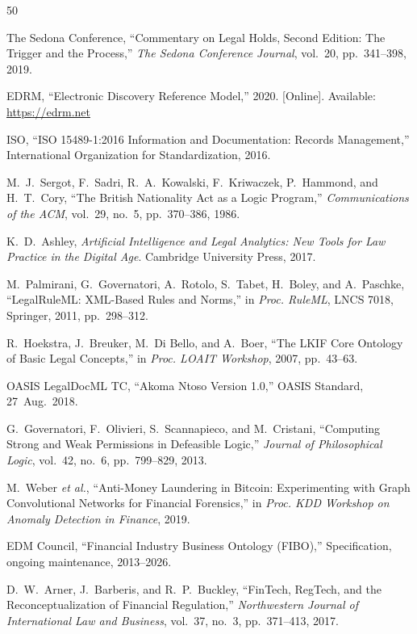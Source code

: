\documentclass{ieeeaccess}
\begin{document}
\begin{thebibliography}{50}

The Sedona Conference, ``Commentary on Legal Holds, Second Edition: The Trigger and the Process,'' \textit{The Sedona Conference Journal}, vol.~20, pp.~341--398, 2019.

EDRM, ``Electronic Discovery Reference Model,'' 2020. [Online]. Available: \url{https://edrm.net}

ISO, ``ISO 15489-1:2016 Information and Documentation: Records Management,'' International Organization for Standardization, 2016.

M.~J.~Sergot, F.~Sadri, R.~A.~Kowalski, F.~Kriwaczek, P.~Hammond, and H.~T.~Cory, ``The British Nationality Act as a Logic Program,'' \textit{Communications of the ACM}, vol.~29, no.~5, pp.~370--386, 1986.

K.~D.~Ashley, \textit{Artificial Intelligence and Legal Analytics: New Tools for Law Practice in the Digital Age}. Cambridge University Press, 2017.

M.~Palmirani, G.~Governatori, A.~Rotolo, S.~Tabet, H.~Boley, and A.~Paschke, ``LegalRuleML: XML-Based Rules and Norms,'' in \textit{Proc. RuleML}, LNCS 7018, Springer, 2011, pp.~298--312.

R.~Hoekstra, J.~Breuker, M.~Di Bello, and A.~Boer, ``The LKIF Core Ontology of Basic Legal Concepts,'' in \textit{Proc. LOAIT Workshop}, 2007, pp.~43--63.

OASIS LegalDocML TC, ``Akoma Ntoso Version 1.0,'' OASIS Standard, 27~Aug.~2018.

G.~Governatori, F.~Olivieri, S.~Scannapieco, and M.~Cristani, ``Computing Strong and Weak Permissions in Defeasible Logic,'' \textit{Journal of Philosophical Logic}, vol.~42, no.~6, pp.~799--829, 2013.

M.~Weber \textit{et al.}, ``Anti-Money Laundering in Bitcoin: Experimenting with Graph Convolutional Networks for Financial Forensics,'' in \textit{Proc. KDD Workshop on Anomaly Detection in Finance}, 2019.

EDM Council, ``Financial Industry Business Ontology (FIBO),'' Specification, ongoing maintenance, 2013--2026.

D.~W.~Arner, J.~Barberis, and R.~P.~Buckley, ``FinTech, RegTech, and the Reconceptualization of Financial Regulation,'' \textit{Northwestern Journal of International Law and Business}, vol.~37, no.~3, pp.~371--413, 2017.


\end{thebibliography}
\end{document}
